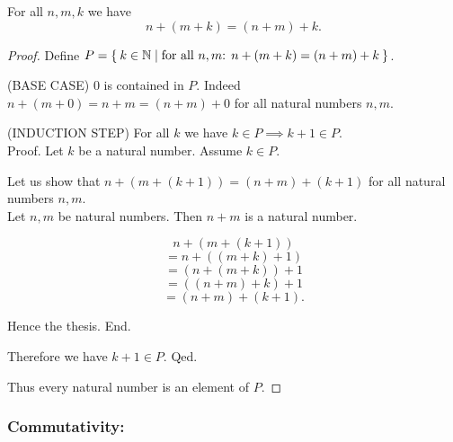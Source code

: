 \documentclass[../../arithmetic.ftl.tex]{subfiles}
\begin{document}
  \begin{forthel}
    \begin{proposition}\label{Arithmetic_01_02_468785}
      For all $n,m,k$ we have \[ n + (m + k) = (n + m) + k. \]
    \end{proposition}
    \begin{proof}
      Define $P = \Set{ k \in \mathbb{N} | \text{for all $n,m$: $n + (m + k) = (n + m) + k$}}$.

      (BASE CASE) $0$ is contained in $P$.
      Indeed $n + (m + 0) = n + m = (n + m) + 0$ for all natural numbers $n,m$.

      (INDUCTION STEP) For all $k$ we have $k \in P \implies k + 1 \in P$. \\
      Proof.
        Let $k$ be a natural number.
         Assume $k \in P$.

        Let us show that $n + (m + (k + 1)) = (n + m) + (k + 1)$ for all natural numbers $n,m$. \\
          Let $n,m$ be natural numbers.
          Then $n + m$ is a natural number.

          \[   n + (m + (k + 1)) \]
          \[ = n + ((m + k) + 1) \]  %
          \[ = (n + (m + k)) + 1 \]  %
          \[ = ((n + m) + k) + 1 \]  %
          \[ = (n + m) + (k + 1). \] %

          Hence the thesis.
        End.

        Therefore we have $k + 1 \in P$.
      Qed.

      Thus every natural number is an element of $P$.
    \end{proof}
  \end{forthel}


  \subsubsection*{Commutativity:}
\end{document}
